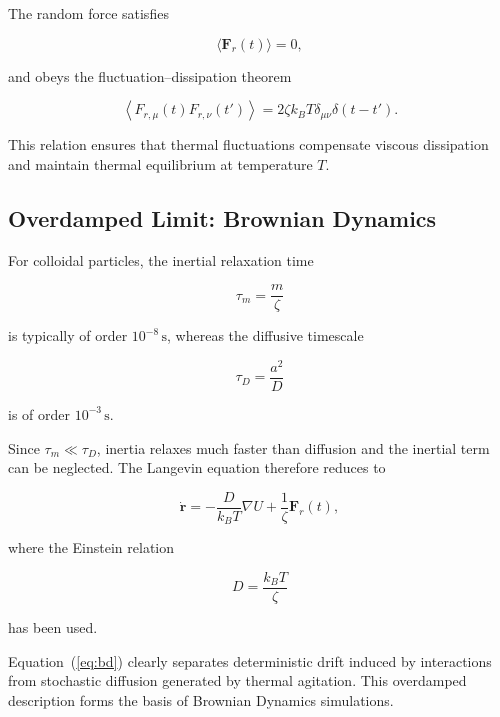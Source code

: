 \documentclass[11pt,a4paper]{article}
\begin{document}
The random force satisfies

\begin{equation}
\langle \mathbf F_r(t)\rangle = 0,
\end{equation}

and obeys the fluctuation--dissipation theorem

\begin{equation}
\left\langle
F_{r,\mu}(t)
F_{r,\nu}(t')
\right\rangle
=
2\zeta k_B T
\delta_{\mu\nu}
\delta(t-t').
\end{equation}

This relation ensures that thermal fluctuations compensate viscous dissipation and maintain thermal equilibrium at temperature $T$.

\subsection{Overdamped Limit: Brownian Dynamics}

For colloidal particles, the inertial relaxation time

\begin{equation}
\tau_m = \frac{m}{\zeta}
\end{equation}

is typically of order $10^{-8}\,\mathrm{s}$, whereas the diffusive timescale

\begin{equation}
\tau_D = \frac{a^2}{D}
\end{equation}

is of order $10^{-3}\,\mathrm{s}$.

Since $\tau_m \ll \tau_D$, inertia relaxes much faster than diffusion and the inertial term can be neglected. The Langevin equation therefore reduces to

\begin{equation}
\dot{\mathbf r}
=
-\frac{D}{k_B T}\nabla U
+
\frac{1}{\zeta}\mathbf F_r(t),
\label{eq:bd}
\end{equation}

where the Einstein relation

\begin{equation}
D=\frac{k_B T}{\zeta}
\end{equation}

has been used.

Equation~(\ref{eq:bd}) clearly separates deterministic drift induced by interactions from stochastic diffusion generated by thermal agitation. This overdamped description forms the basis of Brownian Dynamics simulations.
\end{document}
